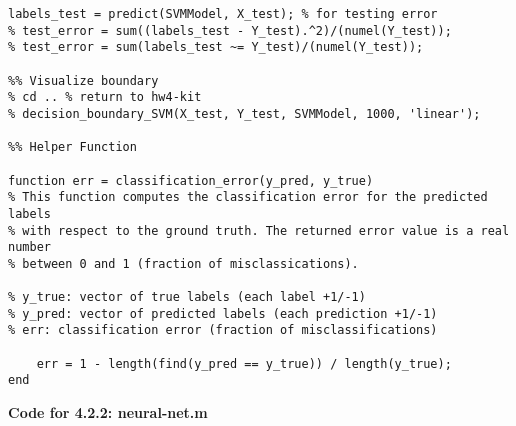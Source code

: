 \documentclass[english]{article}
\begin{document}
\begin{verbatim}
labels_test = predict(SVMModel, X_test); % for testing error
% test_error = sum((labels_test - Y_test).^2)/(numel(Y_test));
% test_error = sum(labels_test ~= Y_test)/(numel(Y_test));

%% Visualize boundary
% cd .. % return to hw4-kit
% decision_boundary_SVM(X_test, Y_test, SVMModel, 1000, 'linear');

%% Helper Function

function err = classification_error(y_pred, y_true)
% This function computes the classification error for the predicted labels
% with respect to the ground truth. The returned error value is a real number
% between 0 and 1 (fraction of misclassications).

% y_true: vector of true labels (each label +1/-1)
% y_pred: vector of predicted labels (each prediction +1/-1)
% err: classification error (fraction of misclassifications)

	err = 1 - length(find(y_pred == y_true)) / length(y_true);
end
\end{verbatim}

\color{black}

\noindent\textbf{Code for 4.2.2: neural-net.m}
\color{red}
\end{document}
